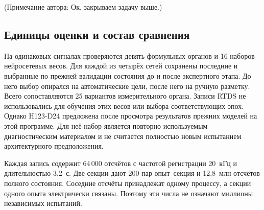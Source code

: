 \iffalse
\ifdefined\AuthorReview
\par\smallskip\begingroup\small\raggedright\color{red!60!black}
\noindent\textbf{Примечание рецензента [R5-09], согласовать целевое состояние.} Выше сказано, что отсутствующий ток не даёт надёжно наблюдаемого направления. В 5.2 подпороговый ток при достаточной поляризации, однако, является применимым нулевым выходом, то есть отсутствием блокировки. Физическая неопределённость знака потока и целевое состояние органа здесь должны различаться столь же явно. Уточнить, какое правило использовано для разгруженного ввода и после отключения выключателя. Это вопрос к единству эталона, а не предложение автоматически изменить метки RTDS.\par\endgroup\smallskip
\fi
\ifdefined\AuthorReview
\par{}\smallskip
\fi
(Примечание автора: Ок, закрываем задачу выше.)
\fi

\subsection{Единицы оценки и состав сравнения}

На одинаковых сигналах проверяются девять формульных органов
и 16 наборов нейросетевых весов.
Для каждой из четырёх сетей сохранены последние
и выбранные по прежней валидации состояния
до и после экспертного этапа.
До него выбор опирался на автоматические цели,
после него на ручную разметку.
Всего сопоставляются 25 вариантов измерительного органа.
Записи RTDS не использовались для обучения этих весов
или выбора соответствующих эпох.
Однако H123-D24 предложена после просмотра
результатов прежних моделей на этой программе.
Для неё набор является повторно используемым диагностическим
материалом и не считается полностью новым испытанием
архитектурного предположения.

Каждая запись содержит 64\,000 отсчётов
с частотой регистрации 20~кГц и длительностью 3,2~с.
Две секции дают 200 пар опыт--секция
и 12,8~млн отсчётов полного состояния.
Соседние отсчёты принадлежат одному процессу,
а секции одного опыта электрически связаны.
Поэтому эти числа не означают миллионы независимых испытаний.

